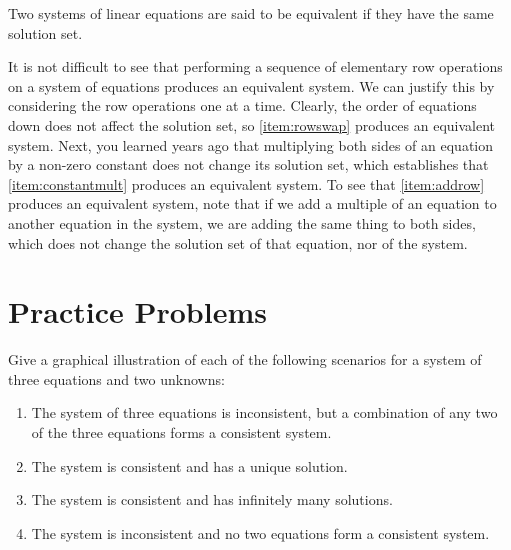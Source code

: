 \documentclass{ximera}
\begin{document}
\begin{definition}\label{def:equivsystems} Two systems of linear equations are said to be equivalent if they have the same solution set.
\end{definition}

It is not difficult to see that performing a sequence of elementary row operations on a system of equations produces an equivalent system.  We can justify this by considering the row operations one at a time.  Clearly, the order of equations down does not affect the solution set, so \ref{item:rowswap} produces an equivalent system.  Next, you learned years ago that multiplying both sides of an equation by a non-zero constant does not change its solution set, which establishes that \ref{item:constantmult} produces an equivalent system.  To see that \ref{item:addrow} produces an equivalent system, note that if we add a multiple of an equation to another equation in the system, we are adding the same thing to both sides, which does not change the solution set of that equation, nor of the system.



\section*{Practice Problems}
\begin{problem}\label{prob:sysgraphillustration}
Give a graphical illustration of each of the following scenarios for a system of three equations and two unknowns:
  \begin{enumerate}
  \item The system of three equations is inconsistent, but a combination of any two of the three equations forms a consistent system.
  \item The system is consistent and has a unique solution.
  \item The system is consistent and has infinitely many solutions.
  \item The system is inconsistent and no two equations form a consistent system.
  \end{enumerate}
\end{problem}
\end{document}
